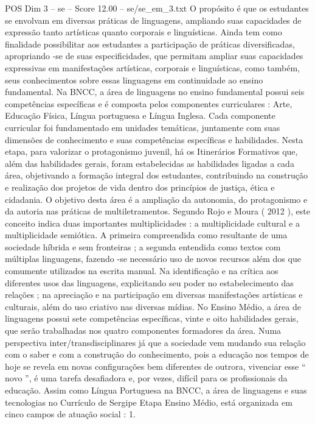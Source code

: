 \begin{textsample}{POS Dim 3 – se – Score 12.00 – se/se\_em\_3.txt}
O propósito é que os estudantes se envolvam em diversas práticas de linguagens, ampliando suas capacidades de expressão tanto artísticas quanto corporais e linguísticas.
Ainda tem como finalidade possibilitar aos estudantes a participação de práticas diversificadas, apropriando -se de suas especificidades, que permitam ampliar suas capacidades expressivas em manifestações artísticas, corporais e linguísticas, como também, seus conhecimentos sobre essas linguagens em continuidade ao ensino fundamental.
Na BNCC, a área de linguagens no ensino fundamental possui seis competências específicas e é composta pelos componentes curriculares : Arte, Educação Física, Língua portuguesa e Língua Inglesa.
Cada componente curricular foi fundamentado em unidades temáticas, juntamente com suas dimensões de conhecimento e suas competências específicas e habilidades.
Nesta etapa, para valorizar o protagonismo juvenil, há os Itinerários Formativos que, além das habilidades gerais, foram estabelecidas as habilidades ligadas a cada área, objetivando a formação integral dos estudantes, contribuindo na construção e realização dos projetos de vida dentro dos princípios de justiça, ética e cidadania.
O objetivo desta área é a ampliação da autonomia, do protagonismo e da autoria nas práticas de multiletramentos.
Segundo Rojo e Moura ( 2012 ), este conceito indica duas importantes multiplicidades : a multiplicidade cultural e a multiplicidade semiótica.
A primeira compreendida como resultante de uma sociedade híbrida e sem fronteiras ; a segunda entendida como textos com múltiplas linguagens, fazendo -se necessário uso de novos recursos além dos que comumente utilizados na escrita manual.
Na identificação e na crítica aos diferentes usos das linguagens, explicitando seu poder no estabelecimento das relações ; na apreciação e na participação em diversas manifestações artísticas e culturais, além do uso criativo nas diversas mídias.
No Ensino Médio, a área de linguagens possui sete competências específicas, vinte e oito habilidades gerais, que serão trabalhadas nos quatro componentes formadores da área.
Numa perspectiva inter/transdisciplinares já que a sociedade vem mudando sua relação com o saber e com a construção do conhecimento, pois a educação nos tempos de hoje se revela em novas configurações bem diferentes de outrora, vivenciar esse “ novo ”, é uma tarefa desafiadora e, por vezes, difícil para os profissionais da educação.
Assim como Língua Portuguesa na BNCC, a área de linguagens e suas tecnologias no Currículo de Sergipe Etapa Ensino Médio, está organizada em cinco campos de atuação social : 1.

\end{textsample}
